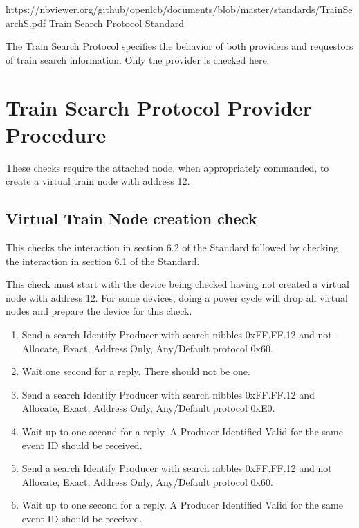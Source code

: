 



\maketitle
\thispagestyle{firststyle}

\introductionCaveats
    {https://nbviewer.org/github/openlcb/documents/blob/master/standards/TrainSearchS.pdf}
    {Train Search Protocol Standard}

The Train Search Protocol specifies the behavior of both providers and requestors of 
train search information.  Only the provider is checked here.


\section{Train Search Protocol Provider Procedure}


These checks require the attached node, when appropriately commanded,
to create a virtual train node with address 12.

\subsection{Virtual Train Node creation check}

This checks the interaction in section 6.2 of the Standard
followed by checking the interaction in section 6.1 of the Standard.

This check must start with the device being checked having not created a
virtual node with address 12. For some devices, doing a power cycle will 
drop all virtual nodes and prepare the device for this check.

\begin{enumerate}

\item Send a search Identify Producer with search nibbles 0xFF.FF.12 and 
    not-Allocate, Exact, Address Only, Any/Default protocol 0x60.
    
\item Wait one second for a reply.  There should not be one.

\item Send a search Identify Producer with search nibbles 0xFF.FF.12 and 
    Allocate, Exact, Address Only, Any/Default protocol 0xE0.

\item Wait up to one second for a reply.  A Producer Identified Valid for the same event ID
    should be received.

\item Send a search Identify Producer with search nibbles 0xFF.FF.12 and 
    not Allocate, Exact, Address Only, Any/Default protocol 0x60.

\item Wait up to one second for a reply.  A Producer Identified Valid for the same event ID
    should be received.    

\end{enumerate}

